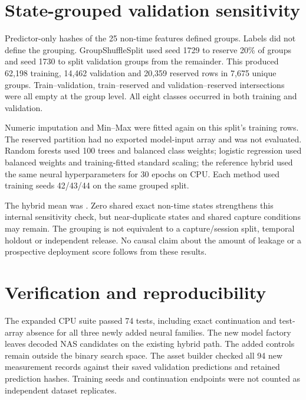 \section{State-grouped validation sensitivity}
Predictor-only hashes of the 25 non-time features defined groups. Labels did not define the grouping. GroupShuffleSplit used seed 1729 to reserve 20\% of groups and seed 1730 to split validation groups from the remainder. This produced 62,198 training, 14,462 validation and 20,359 reserved rows in 7,675 unique groups. Train--validation, train--reserved and validation--reserved intersections were all empty at the group level. All eight classes occurred in both training and validation.

Numeric imputation and Min--Max were fitted again on this split's training rows. The reserved partition had no exported model-input array and was not evaluated. Random forests used 100 trees and balanced class weights; logistic regression used balanced weights and training-fitted standard scaling; the reference hybrid used the same neural hyperparameters for 30 epochs on CPU. Each method used training seeds 42/43/44 on the same grouped split.

\begin{table}[htbp]\centering
\caption{Actual class support in the state-grouped training and validation partitions. Group-based fractions do not enforce equal class proportions or row fractions.}\end{table}

\begin{table}[htbp]\centering\small
\caption{State-grouped validation results, three training seeds. Row counts and class proportions differ from the original random split.}\end{table}
The hybrid mean was \ExtGroupedHybrid{}. Zero shared exact non-time states strengthens this internal sensitivity check, but near-duplicate states and shared capture conditions may remain. The grouping is not equivalent to a capture/session split, temporal holdout or independent release. No causal claim about the amount of leakage or a prospective deployment score follows from these results.

\section{Verification and reproducibility}
The expanded CPU suite passed 74 tests, including exact continuation and test-array absence for all three newly added neural families. The new model factory leaves decoded NAS candidates on the existing hybrid path. The added controls remain outside the binary search space. The asset builder checked all 94 new measurement records against their saved validation predictions and retained prediction hashes. Training seeds and continuation endpoints were not counted as independent dataset replicates.


